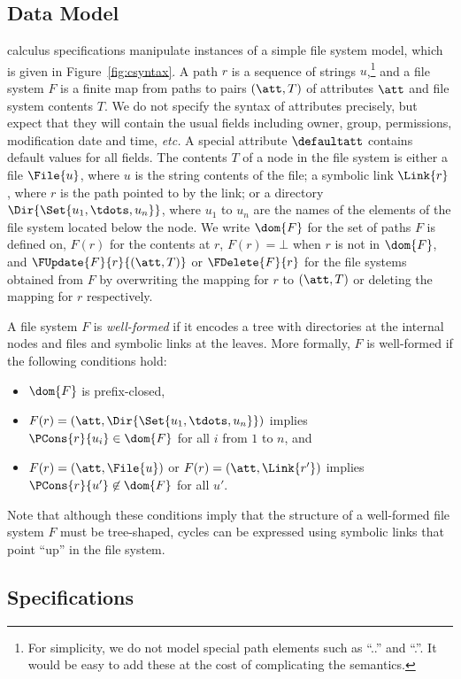 \subsection{Data Model}

\forest{} calculus specifications manipulate instances of a simple
file system model, which is given in Figure~\ref{fig:csyntax}. A path
$r$ is a sequence of strings $u$,\footnote{For simplicity, we do not
  model special path elements such as ``..'' and ``.''.  It would be
  easy to add these at the cost of complicating the semantics.} and a
file system $F$ is a finite map from paths to pairs $(\att,T)$ of
attributes $\att$ and file system contents $T$.  We do not specify the
syntax of attributes precisely, but expect that they will contain the
usual fields including owner, group, permissions, modification date
and time, {\it etc.} A special attribute $\defaultatt$ contains
default values for all fields. The contents $T$ of a node in the file
system is either a file $\File{u}$, where $u$ is the string contents
of the file; a symbolic link $\Link{r}$, where $r$ is the path pointed
to by the link; or a directory $\Dir{\Set{u_1,\tdots,u_n}}$, where
$u_1$ to $u_n$ are the names of the elements of the file system
located below the node. We write $\dom{F}$ for the set of paths $F$ is
defined on, $F(r)$ for the contents at $r$, $F(r) = \bot$ when $r$ is
not in $\dom{F}$, and $\FUpdate{F}{r}{(\att,T)}$ or $\FDelete{F}{r}$
for the file systems obtained from $F$ by overwriting the mapping for
$r$ to $(\att,T)$ or deleting the mapping for $r$ respectively.

A file system $F$ is {\em well-formed} if it encodes a tree with
directories at the internal nodes and files and symbolic links at the
leaves. More formally, $F$ is well-formed if the following conditions
hold:
%
\begin{itemize}
\item $\dom{F}$ is prefix-closed,
\item $F(r) = (\att,\Dir{ \Set{u_1,\tdots,u_n} })$ implies
  $\PCons{r}{u_i} \in \dom{F}$ for all $i$ from $1$ to $n$, and
\item $F(r) = (\att,\File{u})$ or $F(r) = (\att,\Link{r'})$ implies
  $\PCons{r}{u'} \not\in \dom{F}$ for all $u'$.
\end{itemize}
%
Note that although these conditions imply that the structure of a
well-formed file system $F$ must be tree-shaped, cycles can be
expressed using symbolic links that point ``up'' in the file
system.

\subsection{Specifications}

